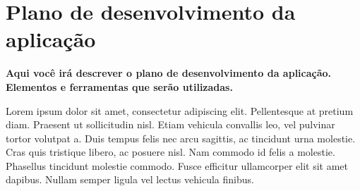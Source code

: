 \section{Plano de desenvolvimento da aplicação}
\textbf{Aqui você irá descrever o plano de desenvolvimento da aplicação.
Elementos e ferramentas que serão utilizadas.}

Lorem ipsum dolor sit amet, consectetur adipiscing elit. Pellentesque at pretium
diam. Praesent ut sollicitudin nisl. Etiam vehicula convallis leo, vel pulvinar tortor
volutpat a. Duis tempus felis nec arcu sagittis, ac tincidunt urna molestie. Cras quis
tristique libero, ac posuere nisl. Nam commodo id felis a molestie. Phasellus tincidunt
molestie commodo. Fusce efficitur ullamcorper elit sit amet dapibus. Nullam semper
ligula vel lectus vehicula finibus.